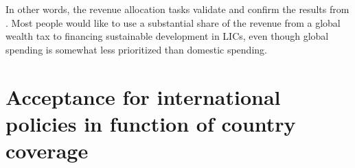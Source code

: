 \documentclass[12pt,english]{article}
\begin{document}
\begin{bibunit}
In other words, the revenue allocation tasks validate and confirm the results from \citep{fabre_majority_2025}. Most people would like to use a substantial share of the revenue from a global wealth tax to financing sustainable development in LICs, even though global spending is somewhat less prioritized than domestic spending. 


\section{Acceptance for international policies in function of country coverage\label{sec:coverage}}



\end{bibunit}
\end{document}
